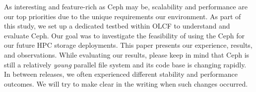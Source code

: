 \begin{comment}
\begin{itemize}
 
\item Ceph has an intelligent and powerful data placement mechanism, known as
  CRUSH. The CRUSH algorithm allows a client to pre-calculate object
  placement and layout while taking into consideration of failure domains and
  hierarchical storage tiers.
  
  \item From the start, Ceph's design anticipated managing meta data and the
  name space with a cluster of meta data servers. It utilized a dynamic subtree
  partitioning strategy to continuously adapt meta data distribution to current
  demands.

  \item Ceph's design assumes that the system is composed of unreliable
  components; fault-detection and fault-tolerance (e.g., replication) are the
  norm rather than the exception. This is in line with the expectations and
  future directions of Exascale computing.

  \item Ceph is built on top of a unified object management layer, RADOS. Both
  meta data and the file data can take advantage of this uniformity. On top of
  RADOS, Ceph build and project a host of other features such as RESTful
  interface, S3 and Swift-compliant API, cloud integration.

  \item Most of the Ceph processes reside in user-space. Generally speaking,
this makes the system easier to debug and maintain. The client-side support has
long been integrated into Linux mainline kernel, which eases the deployment and
out-of-box experience.

\end{itemize}
\end{comment}

As interesting and feature-rich as Ceph may be,  scalability and performance
are our top priorities due to the unique requirements our environment.  As part
of this study, we set up a dedicated testbed within OLCF to understand and
evaluate Ceph.  Our goal was to investigate the feasibility of using the Ceph
for our future HPC storage deployments. This paper presents our experience,
results, and observations.  While evaluating our results, please keep in mind
that Ceph is still a relatively \textit{young} parallel file system and its
code base is changing rapidly. In between releases, we often experienced
different stability and performance outcomes.  We will try to make clear in the
writing when such changes occurred.

